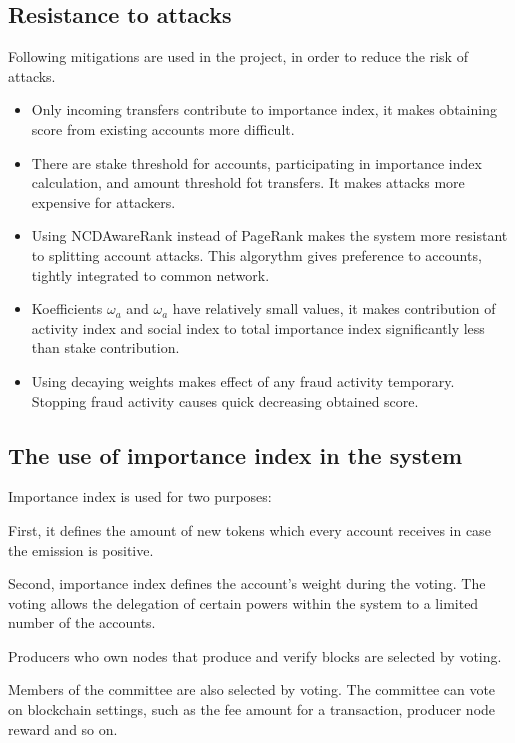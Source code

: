\documentclass[a4paper,12pt]{article}
\begin{document}
\subsection{Resistance to attacks}

Following mitigations are used in the project, in order to reduce the risk of attacks.

\begin{itemize}
  \item Only incoming transfers contribute to importance index, it makes obtaining score from existing accounts more difficult.
  \item There are stake threshold for accounts, participating in importance index calculation, and amount threshold fot transfers. It makes attacks more expensive for attackers.
  \item Using NCDAwareRank instead of PageRank makes the system more resistant to splitting account attacks. This algorythm gives preference to accounts, tightly integrated to common network.
  \item Koefficients $\omega_a$ and $\omega_a$ have relatively small values, it makes contribution of activity index and social index to total importance index significantly less than stake contribution.
  \item Using decaying weights makes effect of any fraud activity temporary. Stopping fraud activity causes quick decreasing obtained score.
\end{itemize}


\subsection{The use of importance index in the system}

Importance index is used for two purposes:

First, it defines the amount of new tokens which every account receives in case the emission is positive. 

Second, importance index defines the account’s weight during the voting. The voting allows the delegation  of certain powers within the system to a limited number of the accounts. 

Producers who own nodes that produce and verify blocks are selected by voting.

Members of the committee are also selected by voting. The committee can vote on blockchain settings, such as the fee amount for a transaction, producer node reward and so on. 
\end{document}
